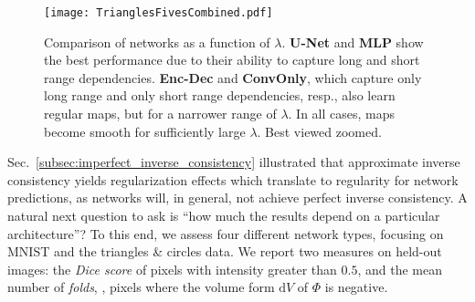 \documentclass[10pt,twocolumn,letterpaper]{article} %
\begin{document}
\begin{figure}
  \texttt{[image: TrianglesFivesCombined.pdf]}

\caption{Comparison of networks as a function of $\lambda$. \textbf{U-Net} and \textbf{MLP} show the best performance due to their ability to capture long and short range dependencies. \textbf{Enc-Dec} and \textbf{ConvOnly}, which capture only long range and only short range dependencies, resp., also learn regular maps, but for a narrower range of $\lambda$. In all cases, maps become smooth for sufficiently large $\lambda$. Best viewed zoomed.} \label{fig:registration_across_architectures}
\vspace{-0.2cm}
\end{figure}

Sec.~\ref{subsec:imperfect_inverse_consistency} illustrated that approximate inverse consistency yields regularization effects which translate to regularity for network predictions, as networks will, in general, not achieve perfect inverse consistency. A natural next question to ask is ``how much the results depend on a particular architecture''? To this end, we assess four different network types, focusing on MNIST and the triangles \& circles data. We report two measures on held-out images: the \emph{Dice score} of pixels with intensity greater than $0.5$, and the mean number of \emph{folds}, \ie, pixels where the volume form $\mathrm{d}V$ of $\Phi$ is negative.


\end{document}

